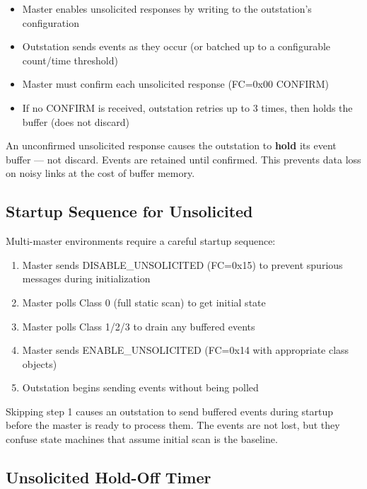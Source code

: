 \documentclass[11pt,twoside]{article}
\begin{document}
\begin{itemize}[noitemsep]
  \item Master enables unsolicited responses by writing to the outstation's configuration
  \item Outstation sends events as they occur (or batched up to a configurable count/time threshold)
  \item Master must confirm each unsolicited response (FC=0x00 CONFIRM)
  \item If no CONFIRM is received, outstation retries up to 3 times, then holds the buffer (does not discard)
\end{itemize}

\begin{keybox}
An unconfirmed unsolicited response causes the outstation to \textbf{hold} its event buffer --- not discard. Events are retained until confirmed. This prevents data loss on noisy links at the cost of buffer memory.
\end{keybox}

\subsection{Startup Sequence for Unsolicited}

Multi-master environments require a careful startup sequence:
\begin{enumerate}[noitemsep]
  \item Master sends DISABLE\_UNSOLICITED (FC=0x15) to prevent spurious messages during initialization
  \item Master polls Class 0 (full static scan) to get initial state
  \item Master polls Class 1/2/3 to drain any buffered events
  \item Master sends ENABLE\_UNSOLICITED (FC=0x14 with appropriate class objects)
  \item Outstation begins sending events without being polled
\end{enumerate}

Skipping step 1 causes an outstation to send buffered events during startup before the master is ready to process them. The events are not lost, but they confuse state machines that assume initial scan is the baseline.

\subsection{Unsolicited Hold-Off Timer}
\end{document}
